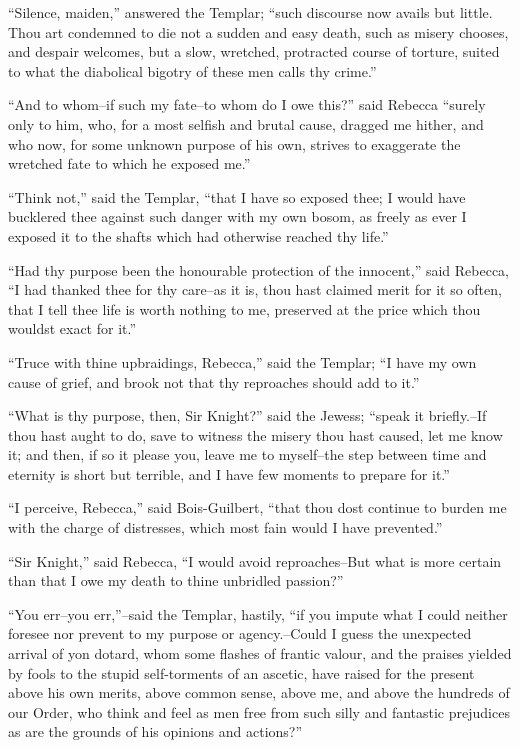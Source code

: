 ``Silence, maiden,'' answered the Templar; ``such discourse now avails
but little. Thou art condemned to die not a sudden and easy death, such
as misery chooses, and despair welcomes, but a slow, wretched,
protracted course of torture, suited to what the diabolical bigotry of
these men calls thy crime.''

``And to whom--if such my fate--to whom do I owe this?'' said Rebecca
``surely only to him, who, for a most selfish and brutal cause, dragged
me hither, and who now, for some unknown purpose of his own, strives to
exaggerate the wretched fate to which he exposed me.''

``Think not,'' said the Templar, ``that I have so exposed thee; I would
have bucklered thee against such danger with my own bosom, as freely as
ever I exposed it to the shafts which had otherwise reached thy life.''

``Had thy purpose been the honourable protection of the innocent,'' said
Rebecca, ``I had thanked thee for thy care--as it is, thou hast claimed
merit for it so often, that I tell thee life is worth nothing to me,
preserved at the price which thou wouldst exact for it.''

``Truce with thine upbraidings, Rebecca,'' said the Templar; ``I have my
own cause of grief, and brook not that thy reproaches should add to
it.''

``What is thy purpose, then, Sir Knight?'' said the Jewess; ``speak it
briefly.--If thou hast aught to do, save to witness the misery thou hast
caused, let me know it; and then, if so it please you, leave me to
myself--the step between time and eternity is short but terrible, and I
have few moments to prepare for it.''

``I perceive, Rebecca,'' said Bois-Guilbert, ``that thou dost continue
to burden me with the charge of distresses, which most fain would I have
prevented.''

``Sir Knight,'' said Rebecca, ``I would avoid reproaches--But what is
more certain than that I owe my death to thine unbridled passion?''

``You err--you err,''--said the Templar, hastily, ``if you impute what I
could neither foresee nor prevent to my purpose or agency.--Could I
guess the unexpected arrival of yon dotard, whom some flashes of frantic
valour, and the praises yielded by fools to the stupid self-torments of
an ascetic, have raised for the present above his own merits, above
common sense, above me, and above the hundreds of our Order, who think
and feel as men free from such silly and fantastic prejudices as are the
grounds of his opinions and actions?''

